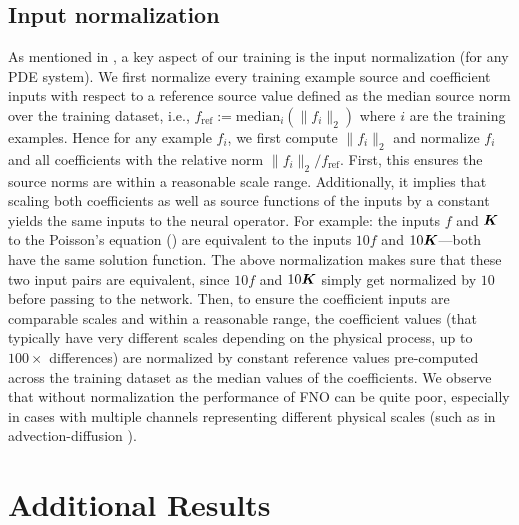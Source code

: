 \subsection{Input normalization}
\label{sec:normalization}
As mentioned in , a key aspect of our training is the input normalization (for any PDE system). We first normalize every training example source and coefficient inputs with respect to a reference source value defined as the median source norm over the training dataset, i.e., $f_{\text{ref}}:=\text{median}_i(\|f_i\|_2)$ where $i$ are the training examples. 
Hence for any example $f_i$, we first compute $\|f_i\|_2$ and normalize $f_i$ and all coefficients with the relative norm $\|f_i\|_2/f_{\text{ref}}$. 
First, this ensures the source norms are within a reasonable scale range.  Additionally,
it implies that scaling both coefficients as well as source functions of the
inputs by a constant yields the same inputs to the neural operator.
For example: the inputs $f$ and $\boldsymbol{K}$ to the Poisson's equation (\sysA{}) are equivalent to the inputs $10f$ and $10\boldsymbol{K}$---both have the same solution function. The above normalization makes sure that these two input pairs are equivalent, since $10f$ and $10\boldsymbol{K}$ simply get normalized by $10$ before passing to the network.
Then, to ensure the coefficient inputs are comparable scales and within a reasonable range, the coefficient values (that typically have very different scales depending on the physical process, up to $100\times$ differences) are normalized by constant reference values pre-computed across the training dataset as the median values of the coefficients.
We observe that without normalization the performance of FNO can be quite poor, especially in cases with multiple channels representing different physical scales (such as in advection-diffusion \sysB{}). 


\section{Additional Results}
\label{sec:additional_results}

